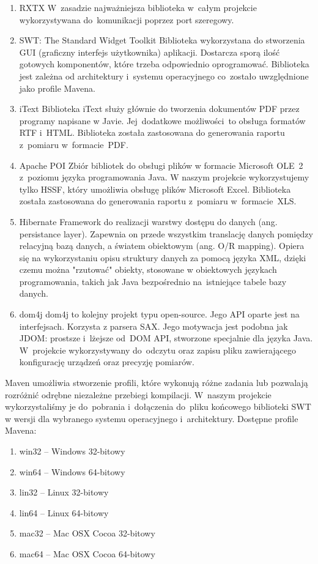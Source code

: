 \begin{enumerate}
\item RXTX \newline
W~zasadzie najważniejsza biblioteka w~całym projekcie wykorzystywana do~komunikacji poprzez port szeregowy.
\item SWT: The Standard Widget Toolkit \newline
Biblioteka wykorzystana do stworzenia GUI (graficzny interfejs użytkownika) aplikacji. Dostarcza sporą ilość gotowych komponentów, które trzeba odpowiednio oprogramować. Biblioteka jest zależna od architektury i~systemu operacyjnego co~zostało uwzględnione jako profile Mavena.
\item iText \newline
Biblioteka iText służy głównie do tworzenia dokumentów PDF przez programy napisane w Javie. Jej~dodatkowe możliwości~to
obsługa formatów RTF i~HTML. Biblioteka została zastosowana do generowania raportu z~pomiaru w~formacie~PDF.
\item Apache POI \newline
Zbiór bibliotek do obsługi plików w formacie Microsoft OLE~2 z~poziomu języka programowania Java. W naszym projekcie wykorzystujemy tylko HSSF, który umożliwia obsługę plików Microsoft Excel. Biblioteka została zastosowana do generowania raportu z~pomiaru w~formacie~XLS.
\item Hibernate \newline
Framework do realizacji warstwy dostępu do danych (ang. persistance layer). Zapewnia on przede wszystkim translację danych pomiędzy relacyjną bazą danych, a światem obiektowym (ang. O/R mapping). Opiera się na wykorzystaniu opisu struktury danych za pomocą języka XML, dzięki czemu można "rzutować" obiekty, stosowane w obiektowych językach programowania, takich jak Java bezpośrednio na~istniejące tabele bazy danych.
\item dom4j \newline
dom4j to kolejny projekt typu open-source. Jego API oparte jest na interfejsach. Korzysta z parsera SAX. Jego motywacja jest podobna jak JDOM: prostsze i~lżejsze od~DOM API, stworzone specjalnie dla języka Java. W~projekcie wykorzystywany do~odczytu oraz zapisu pliku zawierającego konfigurację urządzeń oraz precyzję pomiarów.
\end{enumerate}

Maven umożliwia stworzenie profili, które wykonują różne zadania lub pozwalają rozróżnić odrębne niezależne przebiegi kompilacji. W~naszym projekcie wykorzystaliśmy je do~pobrania i~dołączenia do~pliku końcowego biblioteki SWT w wersji dla wybranego systemu operacyjnego i~architektury. Dostępne profile Mavena:
\begin{enumerate}
\item win32 -- Windows 32-bitowy
\item win64 -- Windows 64-bitowy 
\item lin32 -- Linux 32-bitowy
\item lin64 -- Linux 64-bitowy
\item mac32 -- Mac OSX Cocoa 32-bitowy
\item mac64 -- Mac OSX Cocoa 64-bitowy
\end{enumerate}

